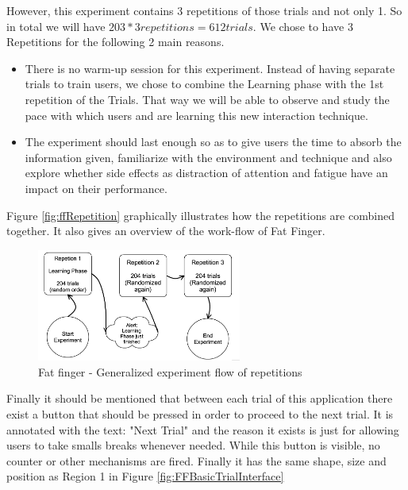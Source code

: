 However, this experiment contains 3 repetitions of those trials and not only 1. So in total we will have $203*3repetitions = 612 trials$. We chose to have 3 Repetitions for the following 2 main reasons. 

\begin{itemize}
	\item There is no warm-up session for this experiment. Instead of having separate trials to train users, we chose to combine the Learning phase with the 1st repetition of the Trials. That way we will be able to observe and study the pace with which users and are learning this new interaction technique.

	\item The experiment should last enough so as to give users the time to absorb the information given, familiarize with the environment and technique and also explore whether side effects as distraction of attention and fatigue have an impact on their performance.
\end{itemize}

Figure \ref{fig:ffRepetition} graphically illustrates how the repetitions are combined together. It also gives an overview of the work-flow of Fat Finger.

\begin{figure}[h]
\centering
\includegraphics[width=0.6\textwidth]{figures/ffRepetitions.png}
\caption{Fat finger - Generalized experiment flow of repetitions}
\label{fig:ffRepetitions}
\end{figure}

Finally it should be mentioned that between each trial of this application there exist a button that should be pressed in order to proceed to the next trial. It is annotated with the text: "Next Trial" and the reason it exists is just for allowing users to take smalls breaks whenever needed. While this button is visible, no counter or other mechanisms are fired. Finally it has the same shape, size and position as Region 1 in Figure \ref{fig:FFBasicTrialInterface}


